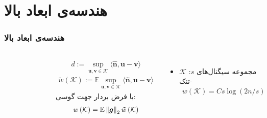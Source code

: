 \section{هندسه‌ی ابعاد بالا\hfill}
\begin{frame}
\frametitle{هندسه‌ی ابعاد بالا}
\begin{columns}
\begin{figure}
\centering
\includegraphics[scale=0.23]{Images/width.png}
\end{figure}
\begin{align*}
	d := \sup_{\bm{u},\bm{v}\in \mathcal{K}} \langle \hat{\bm{n}}, \bm{u}-\bm{v}  \rangle
\end{align*}
\begin{align*} 
\tilde{w}\left(\mathcal{K}\right) := \mathbb{E} \sup_{\bm{u},\bm{v}\in \mathcal{K}} \langle \hat{\bm{n}}, \bm{u}-\bm{v}  \rangle
\end{align*} 
با فرض بردار جهت گوسی:
\begin{align*}
w\left(\mathcal{K}\right) =  \mathbb{E} \left\lVert\bm{g}\right\rVert_{2} \tilde{w}\left(\mathcal{K}\right)
\end{align*} 
\begin{itemize}
\item{$\mathcal{K}$
:مجموعه سیگنال‌های $s$-تنک
\begin{align*}
w\left(\mathcal{K}\right) = Cs \log\left(2n/s\right)
\end{align*}
}
\end{itemize}
\end{columns}
\end{frame}
